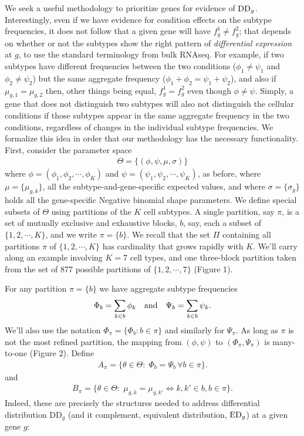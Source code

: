 \documentclass[11pt]{amsart}
\begin{document}
We seek a useful methodology to prioritize genes for evidence
of ${\rm DD}_g$.  Interestingly, even if we have evidence for condition effects
on the subtype frequencies, it does not follow that a given
gene will have $f^1_g \neq f^2_g$; that depends on whether or not the subtypes
show the right pattern of {\em differential expression} at $g$, to use the 
standard terminology from bulk RNAseq.  For example, if two subtypes have 
different frequencies between the two conditions ($\phi_1 \neq \psi_1$ and 
 $\phi_2 \neq \psi_2$) but the same aggregate frequency
($\phi_1+\phi_2 = \psi_1 + \psi_2$),  and also  if $\mu_{g,1} = \mu_{g,2}$
then, other things being equal, $f^1_g = f^2_g$ even though $\phi \neq \psi$.
Simply, a gene that does not distinguish two subtypes will also not distinguish
the cellular conditions if those subtypes appear in the same aggregate frequency
in the two conditions, regardless of changes in the individual subtype 
frequencies. We formalize this idea in order that our methodology
has the necessary functionality.  First, consider the parameter space 
\begin{eqnarray*}
\Theta = \{ (\phi, \psi,\mu, \sigma)  \}
\end{eqnarray*}
where $\phi=(\phi_1, \phi_2, \cdots, \phi_K)$ and $\psi=(\psi_1, \psi_2, \cdots, \psi_K)$,
as before, where $\mu = \{ \mu_{g,k} \}$, all the subtype-and-gene-specific expected
values, and where $\sigma = \{ \sigma_g \}$ holds all the gene-specific Negative binomial
shape parameters.  We define special subsets of $\Theta$ using
partitions of the $K$ cell subtypes.  A single partition, say $\pi$, is a set of
mutually exclusive and exhaustive blocks, $b$, say, each a subset of $\{1, 2, 
\cdots, K\}$, and we write $\pi = \{ b \}$.  We recall 
that the set $\Pi$ containing all partitions $\pi$ of $\{1,2, \cdots, K\}$
has cardinality that grows rapidly with $K$. 
 We'll carry along an example
involving $K=7$ cell types, and one three-block partition taken
from the set of 877 possible partitions of $\{1, 2, \cdots, 7\}$ (Figure 1).

For any partition $\pi=\{b\}$ we have aggregate subtype frequencies
\begin{eqnarray*}
\Phi_b = \sum_{k\in b} \phi_k \quad {\mbox {\rm  and}} \quad 
 \Psi_b = \sum_{k\in b} \psi_k.
\end{eqnarray*}
We'll also use the notation $\Phi_\pi = \{ \Phi_b: b \in \pi \}$ and similarly
for $\Psi_\pi$.   As long as $\pi$ is not the most refined partition,
the mapping from $( \phi, \psi )$ to $( \Phi_\pi, \Psi_\pi)$ is many-to-one
(Figure 2).
Define
\begin{eqnarray*}
A_\pi = \{ \theta\in \Theta: \; \Phi_b = \Psi_b  \, \forall b \in \pi \}.
\end{eqnarray*}
and
\begin{eqnarray*}
B_\pi = \{ \theta \in \Theta: \; \mu_{g,k} = \mu_{g,k'} \iff k,k' \in b, b \in \pi \}.
\end{eqnarray*}
Indeed, these are precisely the
structures needed to address differential distribution DD$_g$ (and
it complement, equivalent distribution, ${\rm ED}_g$) at a given gene
$g$: 
\end{document}
